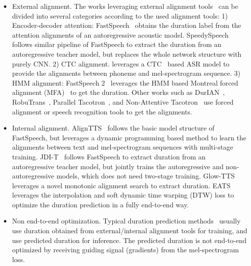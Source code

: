 \documentclass{article}
\begin{document}
 

\begin{itemize}[leftmargin=*]
    \item External alignment. The works leveraging external alignment tools~\cite{wightman1997aligner,graves2006connectionist,mcauliffe2017montreal,li2020moboaligner} can be divided into several categories according to the used alignment tools: 1) Encoder-decoder attention: FastSpeech~\cite{ren2019fastspeech} obtains the duration label from the attention alignments of an autoregressive acoustic model. SpeedySpeech~\cite{vainer2020speedyspeech} follows similar pipeline of FastSpeech to extract the duration from an autoregressive teacher model, but replaces the whole network structure with purely CNN. 2) CTC alignment. \citet{beliaev2020talknet} leverages a CTC~\cite{graves2006connectionist} based ASR model to provide the alignments between phoneme and mel-spectrogram sequence. 3) HMM alignment: FastSpeech 2~\cite{ren2021fastspeech} leverages the HMM based Montreal forced alignment (MFA)~\cite{mcauliffe2017montreal} to get the duration. Other works such as DurIAN~\cite{yu2020durian},  RobuTrans~\cite{li2020robutrans}, Parallel Tacotron~\cite{elias2020parallel}, and Non-Attentive Tacotron~\cite{shen2020non} use forced alignment or speech recognition tools to get the alignments. 
    \item Internal alignment. AlignTTS~\cite{zeng2020aligntts} follows the basic model structure of FastSpeech, but leverages a dynamic programming based method to learn the alignments between text and mel-spectrogram sequences with multi-stage training. JDI-T~\cite{lim2020jdi} follows FastSpeech to extract duration from an autoregressive teacher model, but jointly trains the autoregressive and non-autoregressive models, which does not need two-stage training. Glow-TTS~\cite{kim2020glow} leverages a novel monotonic alignment search to extract duration. EATS~\cite{donahue2020end} leverages the interpolation and soft dynamic time warping (DTW) loss to optimize the duration prediction in a fully end-to-end way.
    \item Non end-to-end optimization. Typical duration prediction methods~\cite{ren2019fastspeech,vainer2020speedyspeech,beliaev2020talknet,ren2021fastspeech,yu2020durian,li2020robutrans,elias2020parallel,shen2020non,zeng2020aligntts,lim2020jdi,kim2020glow} usually use duration obtained from external/internal alignment tools for training, and use predicted duration for inference. The predicted duration is not end-to-end optimized by receiving guiding signal (gradients) from the mel-spectrogram loss. 

\end{itemize}
\end{document}
